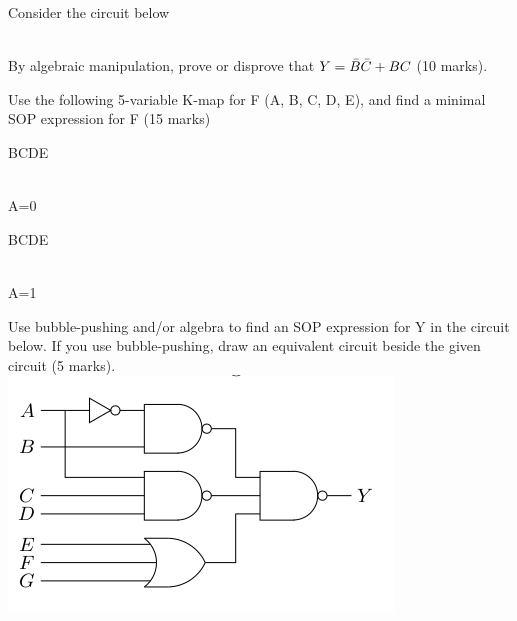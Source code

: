 \begin{prob}
  Consider the circuit below\\
   \\
  By algebraic manipulation, prove or disprove that $Y = \bar{B} \bar{C} + B C$ (10 marks).
\end{prob}

\begin{prob}
Use the following 5-variable K-map for F (A, B, C, D, E), and find
  a minimal SOP expression for F (15 marks)\\
\begin{minipage}{0.5\linewidth}
  \centering
  \begin{Karnaugh}{BC}{DE}
  \end{Karnaugh}\\
  A=0
\end{minipage}%
\begin{minipage}{0.5\linewidth}
  \centering
  \begin{Karnaugh}{BC}{DE}
  \end{Karnaugh}\\
  A=1
\end{minipage}
\end{prob}

\begin{prob}
  Use bubble-pushing and/or algebra to find an SOP expression
for Y in the circuit below. If you use bubble-pushing, draw an equivalent
  circuit beside the given circuit (5 marks).\\
  \includegraphics[width=0.4\linewidth]{figures/bubble-pushing-circuit.png}
\end{prob}


